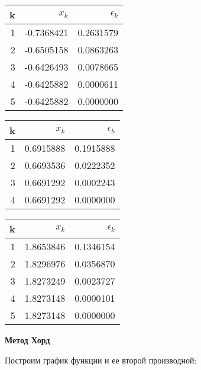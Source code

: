 \documentclass[]{article}
\begin{document}
\begin{tabular}[t]{ |r|r r| }
\hline
k & $x_k$ & $\epsilon_k$\\
\hline
1 & -0.7368421 & 0.2631579 \\
2 & -0.6505158 & 0.0863263 \\
3 & -0.6426493 & 0.0078665 \\
4 & -0.6425882 & 0.0000611 \\
5 & -0.6425882 & 0.0000000 \\
\hline
\end{tabular}
\begin{tabular}[t]{ |r|r r| }
\hline
k & $x_k$ & $\epsilon_k$\\
\hline
1 & 0.6915888 & 0.1915888 \\
2 & 0.6693536 & 0.0222352 \\
3 & 0.6691292 & 0.0002243 \\
4 & 0.6691292 & 0.0000000 \\
\hline
\end{tabular}
\begin{tabular}[t]{ |r|r r| }
\hline
k & $x_k$ & $\epsilon_k$\\
\hline
1 & 1.8653846 & 0.1346154 \\
2 & 1.8296976 & 0.0356870 \\
3 & 1.8273249 & 0.0023727 \\
4 & 1.8273148 & 0.0000101 \\
5 & 1.8273148 & 0.0000000 \\
\hline
\end{tabular}

\newpage
\begin{center}
	\huge\textbf{Метод Хорд}
\end{center}

Построим график функции и ее второй производной:

\begin{center}
\end{center}
\end{document}
